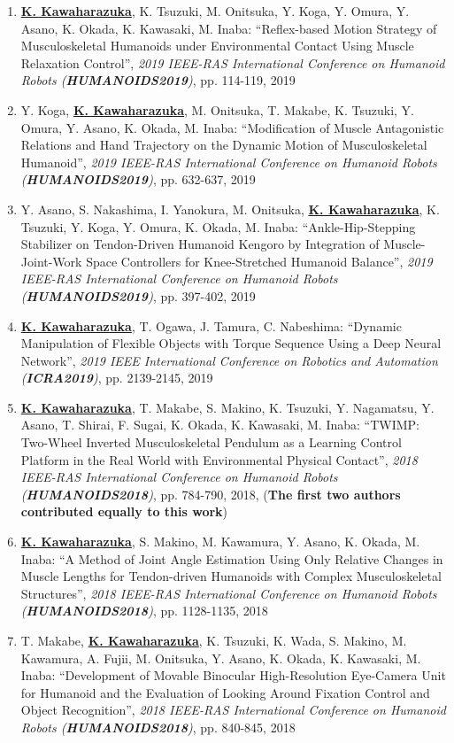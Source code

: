 \documentclass[letterpaper,11pt]{article}
\begin{document}
\begin{enumerate}
\item \underline{\textbf{K. Kawaharazuka}}, K. Tsuzuki, M. Onitsuka, Y. Koga, Y. Omura, Y. Asano, K. Okada, K. Kawasaki, M. Inaba: ``Reflex-based Motion Strategy of Musculoskeletal Humanoids under Environmental Contact Using Muscle Relaxation Control'', \textit{2019 IEEE-RAS International Conference on Humanoid Robots (\textit{\textbf{HUMANOIDS2019}})}, pp. 114-119, 2019
\item Y. Koga, \underline{\textbf{K. Kawaharazuka}}, M. Onitsuka, T. Makabe, K. Tsuzuki, Y. Omura, Y. Asano, K. Okada, M. Inaba: ``Modification of Muscle Antagonistic Relations and Hand Trajectory on the Dynamic Motion of Musculoskeletal Humanoid'', \textit{2019 IEEE-RAS International Conference on Humanoid Robots (\textit{\textbf{HUMANOIDS2019}})}, pp. 632-637, 2019
\item Y. Asano, S. Nakashima, I. Yanokura, M. Onitsuka, \underline{\textbf{K. Kawaharazuka}}, K. Tsuzuki, Y. Koga, Y. Omura, K. Okada, M. Inaba: ``Ankle-Hip-Stepping Stabilizer on Tendon-Driven Humanoid Kengoro by Integration of Muscle-Joint-Work Space Controllers for Knee-Stretched Humanoid Balance'', \textit{2019 IEEE-RAS International Conference on Humanoid Robots (\textit{\textbf{HUMANOIDS2019}})}, pp. 397-402, 2019
\item \underline{\textbf{K. Kawaharazuka}}, T. Ogawa, J. Tamura, C. Nabeshima: ``Dynamic Manipulation of Flexible Objects with Torque Sequence Using a Deep Neural Network'', \textit{2019 IEEE International Conference on Robotics and Automation (\textit{\textbf{ICRA2019}})}, pp. 2139-2145, 2019
\item \underline{\textbf{K. Kawaharazuka}}, T. Makabe, S. Makino, K. Tsuzuki, Y. Nagamatsu, Y. Asano, T. Shirai, F. Sugai, K. Okada, K. Kawasaki, M. Inaba: ``TWIMP: Two-Wheel Inverted Musculoskeletal Pendulum as a Learning Control Platform in the Real World with Environmental Physical Contact'', \textit{2018 IEEE-RAS International Conference on Humanoid Robots (\textit{\textbf{HUMANOIDS2018}})}, pp. 784-790, 2018, (\textbf{The first two authors contributed equally to this work})
\item \underline{\textbf{K. Kawaharazuka}}, S. Makino, M. Kawamura, Y. Asano, K. Okada, M. Inaba: ``A Method of Joint Angle Estimation Using Only Relative Changes in Muscle Lengths for Tendon-driven Humanoids with Complex Musculoskeletal Structures'', \textit{2018 IEEE-RAS International Conference on Humanoid Robots (\textit{\textbf{HUMANOIDS2018}})}, pp. 1128-1135, 2018
\item T. Makabe, \underline{\textbf{K. Kawaharazuka}}, K. Tsuzuki, K. Wada, S. Makino, M. Kawamura, A. Fujii, M. Onitsuka, Y. Asano, K. Okada, K. Kawasaki, M. Inaba: ``Development of Movable Binocular High-Resolution Eye-Camera Unit for Humanoid and the Evaluation of Looking Around Fixation Control and Object Recognition'', \textit{2018 IEEE-RAS International Conference on Humanoid Robots (\textit{\textbf{HUMANOIDS2018}})}, pp. 840-845, 2018

\end{enumerate}
\end{document}
